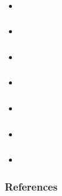 \documentclass{beamer}
\begin{document}
\begin{frame}
  \frametitle{}
  \framesubtitle{}
  \begin{itemize}
    \item 
  \end{itemize}
\end{frame}

\begin{frame}
  \frametitle{}
  \framesubtitle{}
  \begin{itemize}
    \item 
  \end{itemize}
\end{frame}

\begin{frame}
  \frametitle{}
  \framesubtitle{}
  \begin{itemize}
    \item 
  \end{itemize}
\end{frame}

\begin{frame}
  \frametitle{}
  \framesubtitle{}
  \begin{itemize}
    \item 
  \end{itemize}
\end{frame}

\begin{frame}
  \frametitle{}
  \framesubtitle{}
  \begin{itemize}
    \item 
  \end{itemize}
\end{frame}

\begin{frame}
  \frametitle{}
  \framesubtitle{}
  \begin{itemize}
    \item 
  \end{itemize}
\end{frame}

\begin{frame}
  \frametitle{}
  \framesubtitle{}
  \begin{itemize}
    \item 
  \end{itemize}
\end{frame}

\begin{frame}
  \frametitle{References}


\end{frame}
\end{document}
